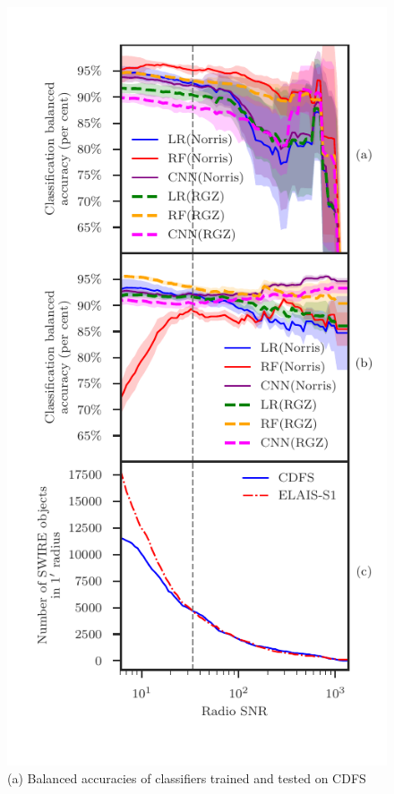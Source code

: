\documentclass[11pt, a4paper]{book}
\begin{document}
  \begin{figure}
    \centering
    \includegraphics[trim={0cm 1cm 0cm 0.5cm}, clip]{atlas-images/accuracies-flux-snr.pdf}
    \caption[Balanced accuracies of classifiers with different SNR cutoffs.]{(a) Balanced accuracies of classifiers trained and tested on CDFS
}
\end{figure}
\end{document}

